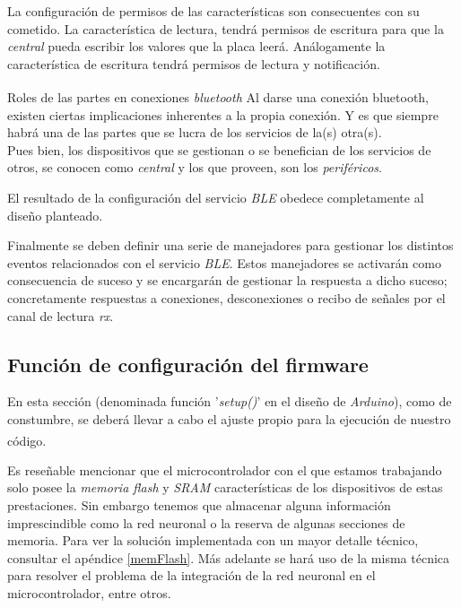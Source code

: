 La configuración de permisos de las características son consecuentes con
su cometido. La característica de lectura, tendrá permisos de escritura
para que la \textit{central} pueda escribir los valores que la placa leerá.
Análogamente la característica de escritura tendrá permisos de lectura y
notificación.

\begin{teoria}{Roles de las partes en conexiones \textit{bluetooth}\textsuperscript{\cite{BLEOreilly}}}
    \color{mitexto}
    Al darse una conexión bluetooth, existen ciertas implicaciones inherentes
    a la propia conexión. Y es que siempre habrá una de las partes que
    se lucra de los servicios de la(s) otra(s).\\
    Pues bien, los dispositivos que se gestionan o se benefician de los
    servicios de otros, se conocen como \textit{central} y los que proveen,
    son los \textit{periféricos}.
\end{teoria}
El resultado de la configuración del servicio \textit{BLE} obedece completamente
al diseño planteado.

Finalmente se deben definir una serie de manejadores para gestionar los
distintos eventos relacionados con el servicio \textit{BLE}. Estos manejadores
se activarán como consecuencia de suceso y se encargarán de gestionar
la respuesta a dicho suceso; concretamente respuestas a conexiones,
desconexiones o recibo de señales por el canal de lectura \textit{rx}.


\subsection{Función de configuración del firmware}
En esta sección (denominada función '\textit{setup()}' en el diseño de \textit{Arduino}),
como de constumbre, se deberá llevar a cabo el ajuste propio para la ejecución
de nuestro código\textsuperscript{\cite{andriyadimw}\cite{petewardenmw}}.

Es reseñable mencionar que el microcontrolador con el que estamos trabajando solo
posee la \textit{memoria flash} y \textit{SRAM} características de
los dispositivos de estas prestaciones. Sin embargo tenemos que almacenar
alguna información imprescindible como la red neuronal o la reserva de algunas
secciones de memoria. Para ver la solución implementada con un mayor detalle técnico,
consultar el apéndice \ref{memFlash}.
Más adelante se hará uso de la misma técnica para resolver el problema
de la integración de la red neuronal en el microcontrolador, entre otros.

